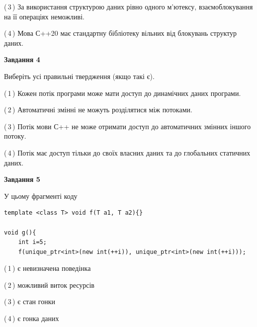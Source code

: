 \documentclass[12pt, ukrainian]{article}
\begin{document}
\begin {large}
{(\,3\,) За використання структурою даних рівно одного м’ютексу, взаємоблокування на її операціях неможливі.%

(\,4\,) Мова С++20 має стандартну бібліотеку вільних від блокувань структур даних.%



\begin{center}
\textbf{Завдання 4}
\end{center}
Виберіть усі правильні твердження (якщо такі є).\par
\vspace{2mm}

(\,1\,) Кожен потік програми може мати доступ до динамічних даних програми.%

(\,2\,) Автоматичні змінні не можуть розділятися між потоками.%

(\,3\,) Потік мови С++ не може отримати доступ до автоматичних змінних іншого потоку.%

(\,4\,) Потік має доступ тільки до своїх власних даних та до глобальних статичних даних.%



\begin{center}
\textbf{Завдання 5}
\end{center}
У цьому фрагменті коду
\begin{verbatim}
template <class T> void f(T a1, T a2){}

void g(){
    int i=5;
    f(unique_ptr<int>(new int(++i)), unique_ptr<int>(new int(++i)));
\end{verbatim}

(\,1\,) є невизначена поведінка%

(\,2\,) можливий виток ресурсів%

(\,3\,) є стан гонки%

(\,4\,) є гонка даних%


}
\end {large}
\end{document}
